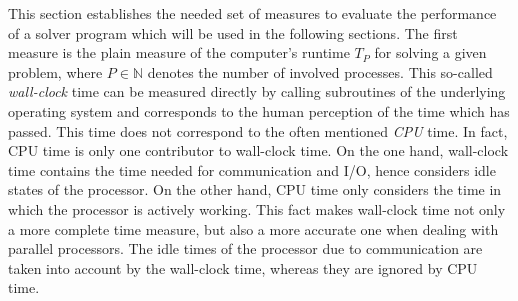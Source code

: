 This section establishes the needed set of measures to evaluate the performance of a solver program which will be used in the following sections. The first measure is the plain measure of the computer's runtime \(T_P\) for solving a given problem, where \(P \in \mathbb{N}\) denotes the number of involved processes. This so-called \emph{wall-clock} time can be measured directly by calling subroutines of the underlying operating system and corresponds to the human perception of the time which has passed. This time does not correspond to the often mentioned \emph{CPU} time. In fact, CPU time is only one contributor to wall-clock time. On the one hand, wall-clock time contains the time needed for communication and I/O, hence considers idle states of the processor. On the other hand, CPU time only considers the time in which the processor is actively working. This fact makes wall-clock time not only a more complete time measure, but also a more accurate one when dealing with parallel processors. The idle times of the processor due to communication are taken into account by the wall-clock time, whereas they are ignored by CPU time.

